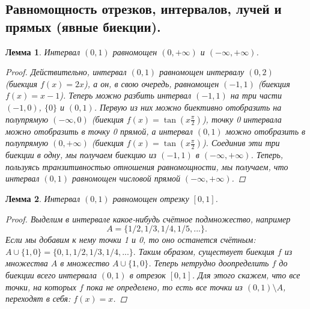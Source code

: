 \documentclass{article}
\newtheorem{lemma}{Лемма}
\begin{document}
\subsection{Равномощность отрезков, интервалов, лучей и прямых (явные биекции).}
\begin{lemma}
Интервал $(0,1)$ равномощен $(0, + \infty)$ и $(- \infty, +\infty)$.
\begin{proof}
Действительно, интервал $(0, 1)$ равномощен интервалу $(0, 2)$ (биекция $f (x) = 2x$), а он, в свою очередь, равномощен $(-1, 1)$ (биекция $f (x) = x - 1$). Теперь можно разбить интервал $(-1, 1)$ на три части $(-1, 0)$, $\{0\}$ и $(0, 1)$. Первую из них можно биективно отобразить на полупрямую $(-\infty, 0)$ (биекция $f (x) = \tan{(x \frac{\pi}{2})}$), точку 0 интервала можно отобразить в точку 0 прямой, а интервал $(0, 1)$ можно отобразить в полупрямую $(0, + \infty)$ (биекция $f (x) = \tan{(x \frac{\pi}{2})}$). Соединив эти три биекции в одну, мы получаем биекцию из $(-1, 1)$ в $(- \infty, +\infty)$. Теперь, пользуясь транзитивностью отношения равномощности, мы получаем, что интервал $(0, 1)$ равномощен числовой прямой $(- \infty, +\infty)$.
\end{proof}
\end{lemma}
\begin{lemma}
Интервал $(0,1)$ равномощен отрезку $[0,1]$.
\begin{proof}
Выделим в интервале какое-нибудь счётное подмножество, например
\[
A = \{1/2, 1/3, 1/4, 1/5, ...\}.
\]
Если мы добавим к нему точки 1 и 0, то оно останется счётным: 
\(
A \cup \{1, 0\} = \{0, 1, 1/2, 1/3, 1/4, ...\}.
\)
Таким образом, существует биекция $f$ из множества $A$ в множество $A \cup \{1, 0\}$. Теперь нетрудно доопределить $f$ до биекции всего интервала $(0,1)$ в отрезок $[0,1]$. Для этого скажем, что все точки, на которых $f$ пока не определено, то есть все точки из $(0, 1) \setminus A$, переходят в себя: $f (x) = x$.
\end{proof}
\end{lemma}
\end{document}
